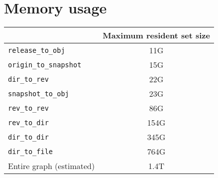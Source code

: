 \documentclass[11pt,a4paper]{article}
\begin{document}
\section{Memory usage}

\begin{center}
    \begin{tabular}{@{} l c @{}}
        \toprule
        \multicolumn{1}{c}{} &
            \textbf{Maximum resident set size} \\
        \midrule
        \texttt{release\_to\_obj} & 11G \\
        \texttt{origin\_to\_snapshot} & 15G \\
        \texttt{dir\_to\_rev} & 22G \\
        \texttt{snapshot\_to\_obj} & 23G \\
        \texttt{rev\_to\_rev} & 86G \\
        \texttt{rev\_to\_dir} & 154G \\
        \texttt{dir\_to\_dir} & 345G \\
        \texttt{dir\_to\_file} & 764G \\
        \midrule
        Entire graph (estimated) & 1.4T \\
        \bottomrule
    \end{tabular}
\end{center}
\end{document}
